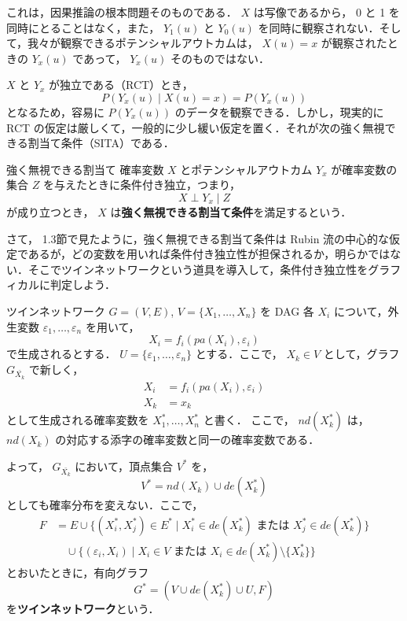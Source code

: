 \documentclass[uplatex, dvipdfmx]{jsarticle}
\begin{document}
これは，因果推論の根本問題そのものである． $X$ は写像であるから， 0 と 1 を同時にとることはなく，また， $Y_1(u)$ と $Y_0(u)$ を同時に観察されない．そして，我々が観察できるポテンシャルアウトカムは， $X(u)=x$ が観察されたときの $Y_x(u)$ であって， $Y_x(u)$ そのものではない．

$X$ と $Y_x$ が独立である（RCT）とき，
\begin{equation}
  P(Y_x(u) \mid X(u)=x) = P(Y_x(u))
\end{equation}
となるため，容易に $P(Y_x(u))$ のデータを観察できる．しかし，現実的に RCT の仮定は厳しくて，一般的に少し緩い仮定を置く．それが次の強く無視できる割当て条件（SITA）である．

\begin{defn}{強く無視できる割当て}
  確率変数 $X$ とポテンシャルアウトカム $Y_x$ が確率変数の集合 $Z$ を与えたときに条件付き独立，つまり，
  \begin{equation}
    X \perp Y_x \mid Z
  \end{equation}
  が成り立つとき， $X$ は\textbf{強く無視できる割当て条件}を満足するという．
\end{defn}

さて， 1.3節で見たように，強く無視できる割当て条件は Rubin 流の中心的な仮定であるが，どの変数を用いれば条件付き独立性が担保されるか，明らかではない．そこでツインネットワークという道具を導入して，条件付き独立性をグラフィカルに判定しよう．

\begin{defn}{ツインネットワーク}
  $G = (V, E)$, $V = \{X_1, \dots, X_n\}$ を DAG 各 $X_i$ について，外生変数 $\varepsilon_1, \dots, \varepsilon_n$ を用いて，
  \begin{equation}
    X_i = f_i(pa(X_i), \varepsilon_i)
  \end{equation}
  で生成されるとする． $U = \{\varepsilon_1, \dots, \varepsilon_n\}$ とする．ここで， $X_k \in V$ として，グラフ $G_{\bar{X_k}}$ で新しく，
  \begin{align}
    X_i &= f_i(pa(X_i), \varepsilon_i) \\
    X_k &= x_k
  \end{align}
  として生成される確率変数を $X_1^*, \dots, X_n^*$ と書く．
  ここで， $nd(X_k^*)$ は， $nd(X_k)$ の対応する添字の確率変数と同一の確率変数である．
  
  よって， $G_{\bar{X_k}}$ において，頂点集合 $V^*$ を，
  \begin{equation}
    V^* = nd(X_k) \cup de(X_k^*)
  \end{equation}
  としても確率分布を変えない．ここで，
  \begin{align}
    F &= E \cup \{ (X_i^*, X_j^*) \in E^* \mid X_i^* \in de(X_k^*) \text{ または } X_j^* \in de(X_k^*) \} \\
    &\quad \cup \{ (\varepsilon_i, X_i) \mid X_i \in V \text{ または } X_i \in de(X_k^*) \setminus \{X_k^*\} \}
  \end{align}
  とおいたときに，有向グラフ
  \begin{equation}
    G^* = (V \cup de(X_k^*) \cup U, F)
  \end{equation}
  を\textbf{ツインネットワーク}という．
\end{defn}
\end{document}
